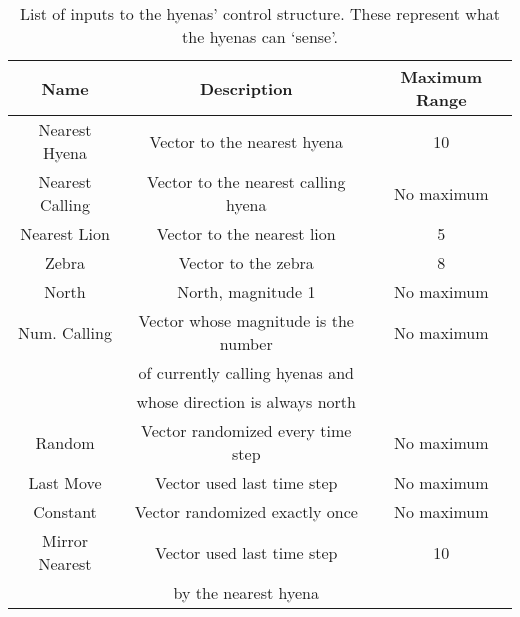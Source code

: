 \documentclass{article}
\begin{document}
\begin{table}[t]
\centering
\begin{tabular}{|c|c|c|}
\hline
Name			& Description & Maximum Range \\
\hline
\hline
Nearest Hyena	& Vector to the nearest hyena & 10\\
\hline
Nearest Calling	& Vector to the nearest calling hyena & No maximum\\
\hline
Nearest Lion	& Vector to the nearest lion & 5 \\
\hline
Zebra			& Vector to the zebra & 8 \\
\hline
North			& North, magnitude 1 & No maximum \\
\hline
Num. Calling	& Vector whose magnitude is the number& No maximum \\
				&  of currently calling hyenas and & \\
				&  whose direction is always north & \\
\hline
Random			& Vector randomized every time step & No maximum \\
\hline
Last Move		& Vector used last time step & No maximum \\
\hline
Constant		& Vector randomized exactly once & No maximum \\
\hline
Mirror Nearest	& Vector used last time step & 10 \\
				& by the nearest hyena & \\
\hline

\end{tabular}
\caption{List of inputs to the hyenas' control structure.  These represent what the hyenas can `sense'.}
\label{tab:hyenaInputs}
\end{table}
\end{document}
